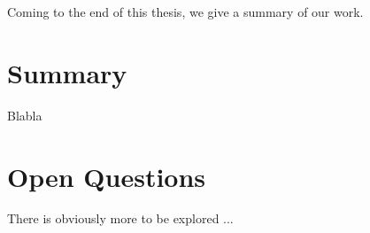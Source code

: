 
\conclusion

\noindent
Coming to the end of this thesis, we give a summary of our work.

\section*{Summary}

Blabla %

\section*{Open Questions}

There is obviously more to be explored ... %
